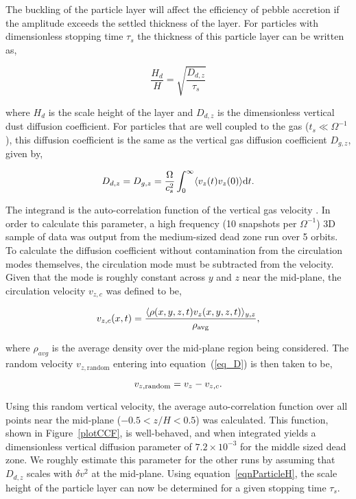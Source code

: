 The buckling of the particle layer will affect the efficiency of pebble accretion if the amplitude exceeds the settled thickness of the layer. For particles with dimensionless stopping time $\tau_s$ the thickness of this particle layer can be written as,   

\begin{equation}
\frac{H_d}{H} = \sqrt{\frac{D_{d,z}}{\tau_s}}     
\label{eqnParticleH}  
\end{equation}

\noindent where $H_d$ is the scale height of the layer and $D_{d,z}$ is the dimensionless vertical dust diffusion coefficient.  For particles that are well coupled to the gas ($t_s \ll \Omega^{-1}$), this diffusion coefficient is the same as the vertical gas diffusion coefficient $D_{g,z}$, given by,  

\begin{equation}
D_{d,z} = D_{g,z} = \frac{\Omega}{c_s^2} \int_{0}^{\infty} \langle v_z(t)v_z(0) \rangle {\rm d}t.          
\label{eq_D}  
\end{equation}

\noindent The integrand is the auto-correlation function of the vertical gas velocity \citep{zhu15}.  In order to calculate this parameter, a high frequency (10 snapshots per $\Omega^{-1}$) 3D sample of data was output from the medium-sized dead zone run over 5 orbits.  To calculate the diffusion coefficient without contamination from the circulation modes themselves, the circulation mode must be subtracted from the velocity.  Given that the mode is roughly constant across $y$ and $z$ near the mid-plane, the circulation velocity $v_{z,c}$ was defined to be,

\begin{equation}
v_{z,c}(x,t) = \frac{\langle \rho(x,y,z,t)  v_z(x,y,z,t) \rangle_{y,z}}{\rho_{\rm avg}},
\end{equation}

\noindent where $\rho_{avg}$ is the average density over the mid-plane region being considered.  The random velocity $v_{z,\text{random}}$ entering into equation~(\ref{eq_D}) is then taken to be,

\begin{equation}
v_{z,{\rm random}} = v_{z}-v_{z,c}.
\end{equation}

Using this random vertical velocity, the average auto-correlation function over all points near the mid-plane ($-0.5<z/H<0.5$) was calculated. This function, shown in Figure~\ref{plotCCF}, is well-behaved, and when integrated yields a dimensionless vertical diffusion parameter of $7.2 \times 10^{-3}$ for the middle sized dead zone. We roughly estimate this parameter for the other runs by assuming that $D_{d,z}$ scales with $\delta v^2$ at the mid-plane. Using equation~\ref{eqnParticleH}, the scale height of the particle layer can now be determined for a given stopping time $\tau_s$. 

